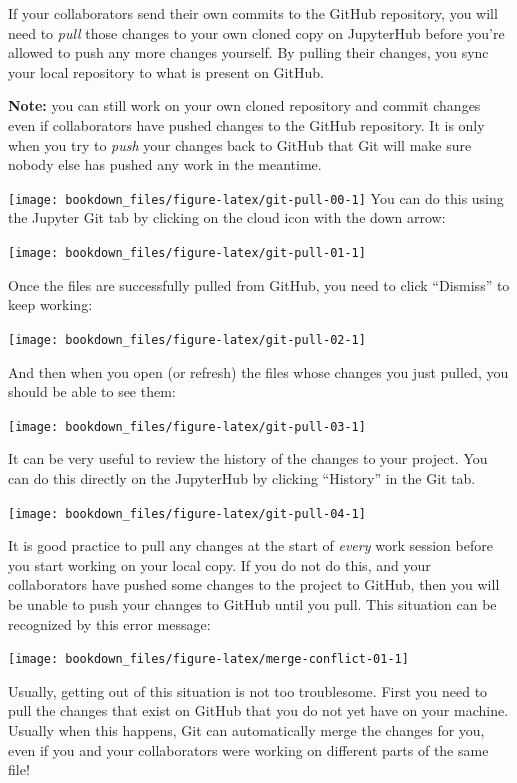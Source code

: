 \documentclass[
]{krantz}
\renewenvironment{quote}{\begin{VF}}{\end{VF}}
\begin{document}
If your collaborators send their own commits to the GitHub repository, you will need to
\emph{pull} those changes to your own cloned copy on JupyterHub before you're allowed to push
any more changes yourself. By pulling their changes, you sync your local repository
to what is present on GitHub.

\begin{quote}
\textbf{Note:} you can still work on your own cloned repository and commit changes even if collaborators
have pushed changes to the GitHub repository. It is only when you try to \emph{push} your changes back to GitHub
that Git will make sure nobody else has pushed any work in the meantime.
\end{quote}

\texttt{[image: bookdown\_files/figure-latex/git-pull-00-1]}
You can do this using the Jupyter Git tab by clicking on the cloud icon with
the down arrow:

\texttt{[image: bookdown\_files/figure-latex/git-pull-01-1]}

Once the files are successfully pulled from GitHub, you need to click ``Dismiss''
to keep working:

\texttt{[image: bookdown\_files/figure-latex/git-pull-02-1]}

And then when you open (or refresh) the files whose changes you just pulled,
you should be able to see them:

\texttt{[image: bookdown\_files/figure-latex/git-pull-03-1]}

It can be very useful to review the history of the changes to your project. You
can do this directly on the JupyterHub by clicking ``History'' in the Git tab.

\texttt{[image: bookdown\_files/figure-latex/git-pull-04-1]}

It is good practice to pull any changes at the start of \emph{every} work session before
you start working on your local copy. If you do not do this, and your collaborators have pushed some changes
to the project to GitHub, then you will be unable to push your changes to
GitHub until you pull. This situation can be recognized by this error message:

\texttt{[image: bookdown\_files/figure-latex/merge-conflict-01-1]}

Usually, getting out of this situation is not too troublesome. First you need to
pull the changes that exist on GitHub that you do not yet have on your machine.
Usually when this happens, Git can automatically merge the changes for you,
even if you and your collaborators were working on different parts of the same
file!
\end{document}
